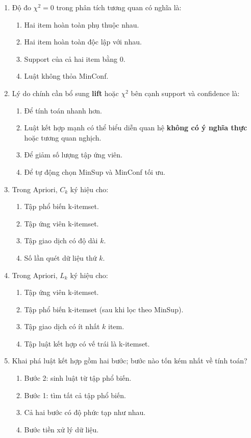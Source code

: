 \documentclass[10pt]{article}
\begin{document}
\begin{enumerate}[leftmargin=*, label=\textbf{Câu \arabic*.}]
    \item Độ đo $\chi^2 = 0$ trong phân tích tương quan có nghĩa là:
    \begin{enumerate}[label=\Alph*.]
        \item Hai item hoàn toàn phụ thuộc nhau.
        \item Hai item hoàn toàn độc lập với nhau.
        \item Support của cả hai item bằng 0.
        \item Luật không thỏa MinConf.
    \end{enumerate}

    \item Lý do chính cần bổ sung \textbf{lift} hoặc $\chi^2$ bên cạnh support và confidence là:
    \begin{enumerate}[label=\Alph*.]
        \item Để tính toán nhanh hơn.
        \item Luật kết hợp mạnh có thể biểu diễn quan hệ \textbf{không có ý nghĩa thực} hoặc tương quan nghịch.
        \item Để giảm số lượng tập ứng viên.
        \item Để tự động chọn MinSup và MinConf tối ưu.
    \end{enumerate}

    \item Trong Apriori, $C_k$ ký hiệu cho:
    \begin{enumerate}[label=\Alph*.]
        \item Tập phổ biến k-itemset.
        \item Tập ứng viên k-itemset.
        \item Tập giao dịch có độ dài $k$.
        \item Số lần quét dữ liệu thứ $k$.
    \end{enumerate}

    \item Trong Apriori, $L_k$ ký hiệu cho:
    \begin{enumerate}[label=\Alph*.]
        \item Tập ứng viên k-itemset.
        \item Tập phổ biến k-itemset (sau khi lọc theo MinSup).
        \item Tập giao dịch có ít nhất $k$ item.
        \item Tập luật kết hợp có vế trái là k-itemset.
    \end{enumerate}

    \item Khai phá luật kết hợp gồm hai bước; bước nào tốn kém nhất về tính toán?
    \begin{enumerate}[label=\Alph*.]
        \item Bước 2: sinh luật từ tập phổ biến.
        \item Bước 1: tìm tất cả tập phổ biến.
        \item Cả hai bước có độ phức tạp như nhau.
        \item Bước tiền xử lý dữ liệu.
    \end{enumerate}


\end{enumerate}
\end{document}
